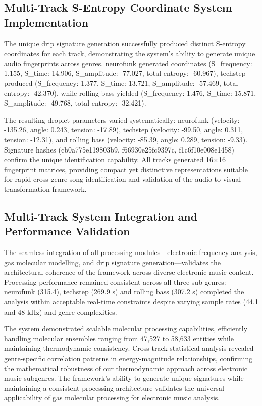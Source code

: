 \documentclass[12pt,a4paper]{article}
\begin{document}
\subsection{Multi-Track S-Entropy Coordinate System Implementation}

The unique drip signature generation successfully produced distinct S-entropy coordinates for each track, demonstrating the system's ability to generate unique audio fingerprints across genres. neurofunk generated coordinates (S\_frequency: 1.155, S\_time: 14.906, S\_amplitude: -77.027, total entropy: -60.967), techstep produced (S\_frequency: 1.377, S\_time: 13.721, S\_amplitude: -57.469, total entropy: -42.370), while rolling bass yielded (S\_frequency: 1.476, S\_time: 15.871, S\_amplitude: -49.768, total entropy: -32.421).

The resulting droplet parameters varied systematically: neurofunk (velocity: -135.26, angle: 0.243, tension: -17.89), techstep (velocity: -99.50, angle: 0.311, tension: -12.31), and rolling bass (velocity: -85.39, angle: 0.289, tension: -9.33). Signature hashes (cb0a775e119803b9, f66930e25fc9397c, f1c6f10e008e1458) confirm the unique identification capability. All tracks generated 16×16 fingerprint matrices, providing compact yet distinctive representations suitable for rapid cross-genre song identification and validation of the audio-to-visual transformation framework.

\subsection{Multi-Track System Integration and Performance Validation}

The seamless integration of all processing modules—electronic frequency analysis, gas molecular modelling, and drip signature generation—validates the architectural coherence of the framework across diverse electronic music content. Processing performance remained consistent across all three sub-genres: neurofunk (315.4), techstep (269.9 s) and rolling bass (307.2 s) completed the analysis within acceptable real-time constraints despite varying sample rates (44.1 and 48 kHz) and genre complexities.

The system demonstrated scalable molecular processing capabilities, efficiently handling molecular ensembles ranging from 47,527 to 58,633 entities while maintaining thermodynamic consistency. Cross-track statistical analysis revealed genre-specific correlation patterns in energy-magnitude relationships, confirming the mathematical robustness of our thermodynamic approach across electronic music subgenres. The framework's ability to generate unique signatures while maintaining a consistent processing architecture validates the universal applicability of gas molecular processing for electronic music analysis.
\end{document}
